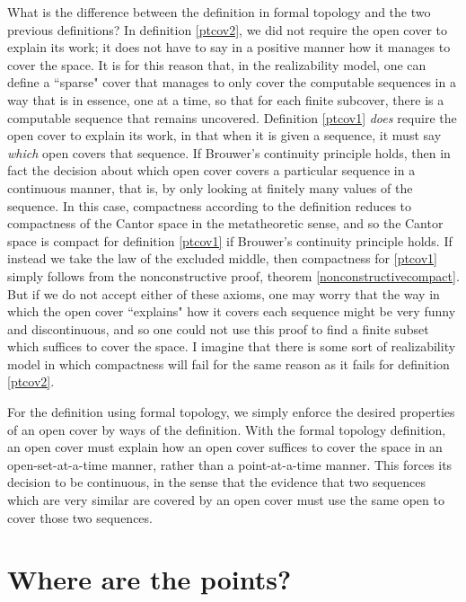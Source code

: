 \documentclass{article}           %
\begin{document}
What is the difference between the definition in formal topology and the two previous definitions? In definition \ref{ptcov2}, we did not require the open cover to explain its work; it does not have to say in a positive manner how it manages to cover the space. It is for this reason that, in the realizability model, one can define a ``sparse" cover that manages to only cover the computable sequences in a way that is in essence, one at a time, so that for each finite subcover, there is a computable sequence that remains uncovered. Definition \ref{ptcov1} \emph{does} require the open cover to explain its work, in that when it is given a sequence, it must say \emph{which} open covers that sequence. If Brouwer's continuity principle holds, then in fact the decision about which open cover covers a particular sequence in a continuous manner, that is, by only looking at finitely many values of the sequence. In this case, compactness according to the definition reduces to compactness of the Cantor space in the metatheoretic sense, and so the Cantor space is compact for definition \ref{ptcov1} if Brouwer's continuity principle holds. If instead we take the law of the excluded middle, then compactness for \ref{ptcov1} simply follows from the nonconstructive proof, theorem \ref{nonconstructivecompact}. But if we do not accept either of these axioms, one may worry that the way in which the open cover ``explains" how it covers each sequence might be very funny and discontinuous, and so one could not use this proof to find a finite subset which suffices to cover the space. I imagine that there is some sort of realizability model in which compactness will fail for the same reason as it fails for definition \ref{ptcov2}.

For the definition using formal topology, we simply enforce the desired properties of an open cover by ways of the definition. With the formal topology definition, an open cover must explain how an open cover suffices to cover the space in an open-set-at-a-time manner, rather than a point-at-a-time manner. This forces its decision to be continuous, in the sense that the evidence that two sequences which are very similar are covered by an open cover must use the same open to cover those two sequences.

\section{Where are the points?}
\end{document}
